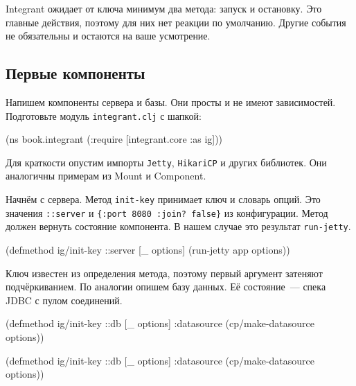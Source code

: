 Integrant ожидает от ключа минимум два метода: запуск и остановку. Это главные
действия, поэтому для них нет реакции по умолчанию. Другие события не
обязательны и остаются на ваше усмотрение.

\subsection{Первые компоненты}


Напишем компоненты сервера и базы. Они просты и не имеют
зависимостей. Подготовьте модуль \verb|integrant.clj| с шапкой:

\begin{english}
  \begin{clojure}
(ns book.integrant
  (:require [integrant.core :as ig]))
  \end{clojure}
\end{english}

Для краткости опустим импорты \verb|Jetty|, \verb|HikariCP| и других
библиотек. Они аналогичны примерам из Mount и Component.

Начнём с сервера. Метод \verb|init-key| принимает ключ и словарь опций. Это
значения \verb|::server| и \verb|{:port 8080 :join? false}| из
конфигурации. Метод должен вернуть состояние компонента. В нашем случае это
результат \verb|run-jetty|.

\begin{english}
  \begin{clojure}
(defmethod ig/init-key ::server
  [_ options]
  (run-jetty app options))
  \end{clojure}
\end{english}


Ключ известен из определения метода, поэтому первый аргумент затеняют
подчёркиванием. По аналогии опишем базу данных. Её состояние~--- спека JDBC с
пулом соединений.

\ifnarrow

\begin{english}
  \begin{clojure}
(defmethod ig/init-key ::db
  [_ options]
  {:datasource
    (cp/make-datasource options)})
  \end{clojure}
\end{english}

\else

\begin{english}
  \begin{clojure}
(defmethod ig/init-key ::db
  [_ options]
  {:datasource (cp/make-datasource options)})
  \end{clojure}
\end{english}

